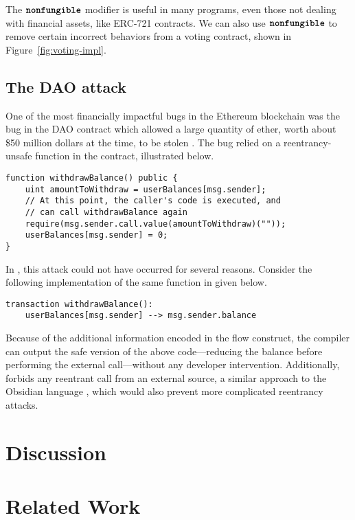 \documentclass[dvipsnames, usenames, sigconf]{acmart}
\begin{document}
The $\textbf{\texttt{nonfungible}}$ modifier is useful in many programs, even those not dealing with financial assets, like ERC-721 contracts.
We can also use $\textbf{\texttt{nonfungible}}$ to remove certain incorrect behaviors from a voting contract, shown in Figure~\ref{fig:voting-impl}.

\subsection{The DAO attack}
One of the most financially impactful bugs in the Ethereum blockchain was the bug in the DAO contract which allowed a large quantity of ether, worth about \$50 million dollars at the time, to be stolen .
The bug relied on a reentrancy-unsafe function in the contract, illustrated below.
\begin{lstlisting}[language=Solidity]
function withdrawBalance() public {
    uint amountToWithdraw = userBalances[msg.sender];
    // At this point, the caller's code is executed, and
    // can call withdrawBalance again
    require(msg.sender.call.value(amountToWithdraw)(""));
    userBalances[msg.sender] = 0;
}
\end{lstlisting}

In \langName, this attack could not have occurred for several reasons.
Consider the following implementation of the same function in \langName given below.
\begin{lstlisting}[language=flow]
transaction withdrawBalance():
    userBalances[msg.sender] --> msg.sender.balance
\end{lstlisting}
Because of the additional information encoded in the flow construct, the compiler can output the safe version of the above code---reducing the balance before performing the external call---without any developer intervention.
Additionally, \langName forbids any reentrant call from an external source, a similar approach to the Obsidian language , which would also prevent more complicated reentrancy attacks.

\section{Discussion}

\section{Related Work}
\end{document}
